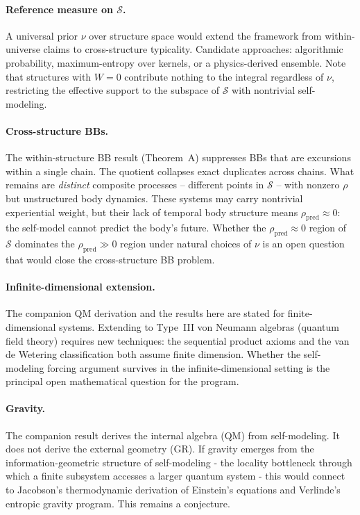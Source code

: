 \documentclass[12pt]{article}
\theoremstyle{remark}
\begin{document}
\paragraph{Reference measure on $\mathcal{S}$.} A universal prior $\nu$ over structure space would extend the framework from within-universe claims to cross-structure typicality. Candidate approaches: algorithmic probability, maximum-entropy over kernels, or a physics-derived ensemble. Note that structures with $W = 0$ contribute nothing to the integral regardless of $\nu$, restricting the effective support to the subspace of $\mathcal{S}$ with nontrivial self-modeling.

\paragraph{Cross-structure BBs.} The within-structure BB result (Theorem~A) suppresses BBs that are excursions within a single chain. The quotient collapses exact duplicates across chains. What remains are \emph{distinct} composite processes -- different points in $\mathcal{S}$ -- with nonzero $\rho$ but unstructured body dynamics. These systems may carry nontrivial experiential weight, but their lack of temporal body structure means $\rho_{\mathrm{pred}} \approx 0$: the self-model cannot predict the body's future. Whether the $\rho_{\mathrm{pred}} \approx 0$ region of $\mathcal{S}$ dominates the $\rho_{\mathrm{pred}} \gg 0$ region under natural choices of $\nu$ is an open question that would close the cross-structure BB problem.

\paragraph{Infinite-dimensional extension.} The companion QM derivation \cite{ehrlich2026qm} and the results here are stated for finite-dimensional systems. Extending to Type~III von Neumann algebras (quantum field theory) requires new techniques: the sequential product axioms and the van de Wetering classification \cite{vdw2019a} both assume finite dimension. Whether the self-modeling forcing argument survives in the infinite-dimensional setting is the principal open mathematical question for the program.

\paragraph{Gravity.} The companion result \cite{ehrlich2026qm} derives the internal algebra (QM) from self-modeling. It does not derive the external geometry (GR). If gravity emerges from the information-geometric structure of self-modeling - the locality bottleneck through which a finite subsystem accesses a larger quantum system - this would connect to Jacobson's thermodynamic derivation of Einstein's equations \cite{jacobson1995} and Verlinde's entropic gravity program. This remains a conjecture.
\end{document}
